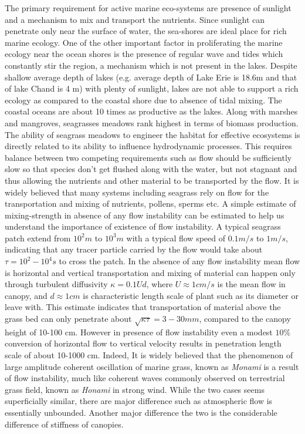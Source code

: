 \documentclass[12pt]{report}   %
\begin{document}
The primary requirement for active marine eco-systems are presence of sunlight and a mechanism to mix and transport the nutrients. Since sunlight can penetrate only near the surface of water, the sea-shores are ideal place for rich marine ecology. One of the other important factor in proliferating the marine ecology near the ocean shores is the presence of regular wave and tides which constantly stir the region, a mechanism which is not present in the lakes. Despite shallow average depth of lakes (e.g. average depth of Lake Erie is 18.6m and that of lake Chand is 4 m) with plenty of sunlight, lakes are not able to support a rich ecology as compared to the coastal shore due to absence of tidal mixing. The coastal oceans are about 10 times as productive as the lakes. Along with marshes and mangroves, seagrasses meadows rank highest in terms of biomass production.
\newline
The ability of seagrass meadows to engineer the habitat for effective ecosystems is directly related to its ability to influence hydrodynamic processes. This requires balance between
two competing requirements such as flow should be sufficiently slow so that species don't get flushed along with the water, but not stagnant and thus allowing the nutrients and other material to be transported by the flow. It is widely believed that many systems including seagrass rely on flow for the transportation and mixing of nutrients, pollens, sperms etc. A simple estimate of mixing-strength in absence of any flow instability can be estimated to help us understand the importance of existence of flow instability. A typical seagrass patch extend from $10^2 m$ to $10^3 m$ with a typical flow speed of $0.1 m/s$ to $1 m/s$, indicating that any tracer particle carried by the flow would take about $\tau = 10^2-10^4 s$ to cross the patch. In the absence of any flow instability mean flow is horizontal and vertical transportation and mixing of material can happen only through turbulent diffusivity $\kappa =  0.1 U d$, where $ U \approx 1 cm/s$ is the mean flow in canopy, and $d \approx 1cm $ is characteristic 
length scale of plant such as its diameter or leave with. This estimate indicates that transportation of material above the grass bed can only penetrate about $\sqrt{\kappa \tau} = 3-30 mm $, compared to the canopy height of 10-100 cm. However in presence of flow instability even a modest $10\%$ conversion of horizontal flow to vertical velocity results in penetration length scale of about 10-1000 cm. Indeed, It is widely believed that the phenomenon of large amplitude coherent oscillation of marine grass, known as \textit{Monami} is a result of flow instability, much like coherent waves commonly observed on terrestrial grass field, known as \textit{Honami} in strong wind. While the two cases seems superficially similar, there are major difference such as atmospheric flow is essentially unbounded. Another major difference the two is the considerable difference of stiffness of canopies.
\end{document}
